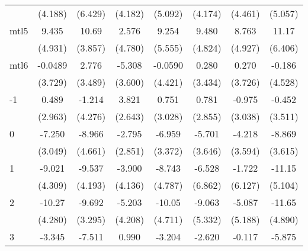 \documentclass{article}
\begin{document}
{\begin{longtable}{l*{7}{c}}
                &  (4.188)         &  (6.429)         &  (4.182)         &  (5.092)         &  (4.174)         &  (4.461)         &  (5.057)         \\
mtl5            &    9.435         &    10.69\sym{**} &    2.576         &    9.254         &    9.480         &    8.763         &    11.17         \\
                &  (4.931)         &  (3.857)         &  (4.780)         &  (5.555)         &  (4.824)         &  (4.927)         &  (6.406)         \\
mtl6            &  -0.0489         &    2.776         &   -5.308         &  -0.0590         &    0.280         &    0.270         &   -0.186         \\
                &  (3.729)         &  (3.489)         &  (3.600)         &  (4.421)         &  (3.434)         &  (3.726)         &  (4.528)         \\
-1              &    0.489         &   -1.214         &    3.821         &    0.751         &    0.781         &   -0.975         &   -0.452         \\
                &  (2.963)         &  (4.276)         &  (2.643)         &  (3.028)         &  (2.855)         &  (3.038)         &  (3.511)         \\
0               &   -7.250\sym{*}  &   -8.966         &   -2.795         &   -6.959\sym{*}  &   -5.701         &   -4.218         &   -8.869\sym{*}  \\
                &  (3.049)         &  (4.661)         &  (2.851)         &  (3.372)         &  (3.646)         &  (3.594)         &  (3.615)         \\
1               &   -9.021\sym{*}  &   -9.537\sym{*}  &   -3.900         &   -8.743         &   -6.528         &   -1.722         &   -11.15\sym{*}  \\
                &  (4.309)         &  (4.193)         &  (4.136)         &  (4.787)         &  (6.862)         &  (6.127)         &  (5.104)         \\
2               &   -10.27\sym{*}  &   -9.692\sym{**} &   -5.203         &   -10.05\sym{*}  &   -9.063         &   -5.087         &   -11.65\sym{*}  \\
                &  (4.280)         &  (3.295)         &  (4.208)         &  (4.711)         &  (5.332)         &  (5.188)         &  (4.890)         \\
3               &   -3.345         &   -7.511\sym{*}  &    0.990         &   -3.204         &   -2.620         &   -0.117         &   -5.875         \\

\end{longtable}}
\end{document}
